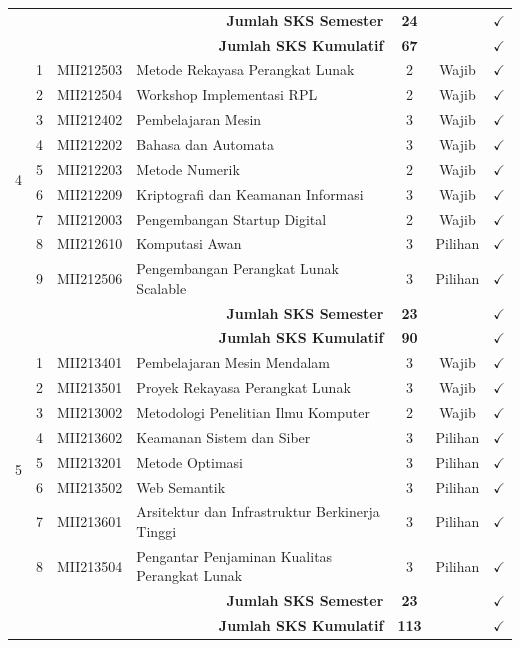 \begin{longtable}{|c|c|l|p{5.5cm}|c|c|c|}
    \hline
    \multicolumn{4}{|r|}{\textbf{Jumlah SKS Semester}} & \textbf{24} & & $\checkmark$ \\
    \multicolumn{4}{|r|}{\textbf{Jumlah SKS Kumulatif}} & \textbf{67} & & $\checkmark$ \\
    \hline
    \multirow{9}{*}{4}
    & 1 & MII212503 & Metode Rekayasa Perangkat Lunak & 2 & Wajib & $\checkmark$ \\
    & 2 & MII212504 & Workshop Implementasi RPL & 2 & Wajib & $\checkmark$ \\
    & 3 & MII212402 & Pembelajaran Mesin & 3 & Wajib & $\checkmark$ \\
    & 4 & MII212202 & Bahasa dan Automata & 3 & Wajib & $\checkmark$ \\
    & 5 & MII212203 & Metode Numerik & 2 & Wajib & $\checkmark$ \\
    & 6 & MII212209 & Kriptografi dan Keamanan Informasi & 3 & Wajib & $\checkmark$ \\
    & 7 & MII212003 & Pengembangan Startup Digital & 2 & Wajib & $\checkmark$ \\
    & 8 & MII212610 & Komputasi Awan & 3 & Pilihan & $\checkmark$ \\
    & 9 & MII212506 & Pengembangan Perangkat Lunak Scalable & 3 & Pilihan & $\checkmark$ \\
    \hline
    \multicolumn{4}{|r|}{\textbf{Jumlah SKS Semester}} & \textbf{23} & & $\checkmark$ \\
    \multicolumn{4}{|r|}{\textbf{Jumlah SKS Kumulatif}} & \textbf{90} & & $\checkmark$ \\
    \hline
    \multirow{8}{*}{5}
    & 1 & MII213401 & Pembelajaran Mesin Mendalam & 3 & Wajib & $\checkmark$ \\
    & 2 & MII213501 & Proyek Rekayasa Perangkat Lunak & 3 & Wajib & $\checkmark$ \\
    & 3 & MII213002 & Metodologi Penelitian Ilmu Komputer & 2 & Wajib & $\checkmark$ \\
    & 4 & MII213602 & Keamanan Sistem dan Siber & 3 & Pilihan & $\checkmark$ \\
    & 5 & MII213201 & Metode Optimasi & 3 & Pilihan & $\checkmark$ \\
    & 6 & MII213502 & Web Semantik & 3 & Pilihan & $\checkmark$ \\
    & 7 & MII213601 & Arsitektur dan Infrastruktur Berkinerja Tinggi & 3 & Pilihan & $\checkmark$ \\
    & 8 & MII213504 & Pengantar Penjaminan Kualitas Perangkat Lunak & 3 & Pilihan & $\checkmark$ \\
    \hline
    \multicolumn{4}{|r|}{\textbf{Jumlah SKS Semester}} & \textbf{23} & & $\checkmark$ \\
    \multicolumn{4}{|r|}{\textbf{Jumlah SKS Kumulatif}} & \textbf{113} & & $\checkmark$ \\
    \hline
\end{longtable}

